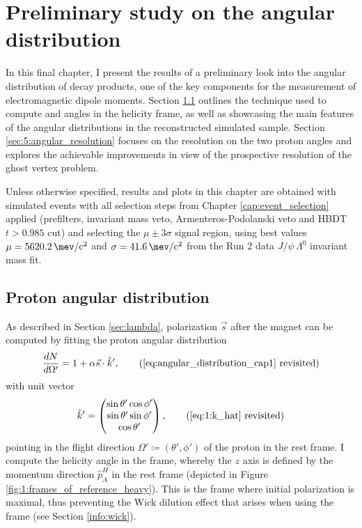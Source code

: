 \chapter{Preliminary study on the \texorpdfstring{\lambdadecay}{Lambda baryon decay} angular distribution}
\label{cap:angular_distribution}

In this final chapter, I present the results of a preliminary look into the angular distribution of \lambdadecay decay products, one of the key components for the measurement of \lz electromagnetic dipole moments.
Section \ref{sec:5:angular_distribution} outlines the technique used to compute \thetap and \phip angles in the \lz helicity frame, as well as showcasing the main features of the angular distributions in the reconstructed \demonstratorshort simulated sample.
Section \ref{sec:5:angular_resolution} focuses on the resolution on the two proton angles and explores the achievable improvements in view of the prospective resolution of the ghost vertex problem.

Unless otherwise specified, results and plots in this chapter are obtained with simulated \demonstratorshort events with all selection steps from Chapter \ref{cap:event_selection} applied (prefilters, \bz invariant mass veto, \kshort Armenteros-Podolanski veto and HBDT $t>0.985$ cut) and selecting the $\mu \pm 3\sigma$ signal region, using best values $\mu=\SI{5620.2}{\mev \per c^2}$ and $\sigma=\SI{41.6}{\mev \per c^2}$ from the Run 2 data $J/\psi\,\Lambda^0$ invariant mass fit.

\section{Proton angular distribution}
\label{sec:5:angular_distribution}
As described in Section \ref{sec:lambda}, \lz polarization $\vec{s}$ after the magnet can be computed by fitting the proton angular distribution
\begin{equation*}
	\frac{dN}{d\Omega'} = 1+ \alpha \vec{s} \cdot \hat{k}',
	\tag{\ref{eq:angular_distribution_cap1} revisited}
\end{equation*}
with unit vector
\begin{equation*}
\hat{k}'
=
\begin{pmatrix}
	\sin \theta' \cos \phi' \\
	\sin \theta' \sin \phi' \\
	\cos \theta'
\end{pmatrix},
\tag{\ref{eq:1:k_hat} revisited}
\end{equation*}
pointing in the flight direction $\Omega' \coloneqq (\theta',\phi')$ of the proton in the \lz rest frame.
I compute the helicity angle in the \slambda frame, whereby the $z$ axis is defined by the \lz momentum direction $\hat{p}_\Lambda^H$ in the \lbz rest frame \shad (depicted in Figure \ref{fig:1:frames_of_reference_heavy}).
This is the frame where initial \lz polarization is maximal, thus preventing the Wick dilution effect that arises when using the \slambdal frame (see Section \ref{info:wick}).

